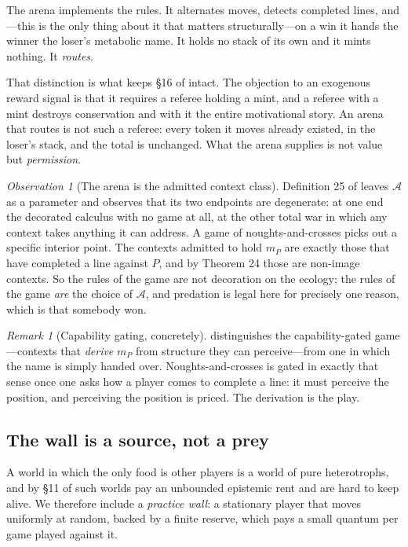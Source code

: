 \documentclass[11pt]{article}
\theoremstyle{definition}
\theoremstyle{plain}
\theoremstyle{remark}
\newtheorem{remark}[definition]{Remark}
\newtheorem{observation}[definition]{Observation}
\begin{document}
The arena implements the rules. It alternates moves, detects completed lines,
and---this is the only thing about it that matters structurally---on a win it
hands the winner the loser's metabolic name. It holds no stack of its own and it
mints nothing. It \emph{routes}.

That distinction is what keeps \S16 of \cite{scientist} intact. The objection to
an exogenous reward signal is that it requires a referee holding a mint, and a
referee with a mint destroys conservation and with it the entire motivational
story. An arena that routes is not such a referee: every token it moves already
existed, in the loser's stack, and the total is unchanged. What the arena
supplies is not value but \emph{permission}.

\begin{observation}[The arena is the admitted context class]
Definition 25 of \cite{scientist} leaves $\mathcal{A}$ as a parameter and
observes that its two endpoints are degenerate: at one end the decorated
calculus with no game at all, at the other total war in which any context takes
anything it can address. A game of noughts-and-crosses picks out a specific
interior point. The contexts admitted to hold $m_P$ are exactly those that have
completed a line against $P$, and by Theorem 24 those are non-image contexts. So
the rules of the game are not decoration on the ecology; the rules of the game
\emph{are} the choice of $\mathcal A$, and predation is legal here for precisely
one reason, which is that somebody won.
\end{observation}

\begin{remark}[Capability gating, concretely]
\cite{scientist} distinguishes the capability-gated game---contexts that
\emph{derive} $m_P$ from structure they can perceive---from one in which the
name is simply handed over. Noughts-and-crosses is gated in exactly that sense
once one asks how a player comes to complete a line: it must perceive the
position, and perceiving the position is priced. The derivation is the play.
\end{remark}

\subsection{The wall is a source, not a prey}

A world in which the only food is other players is a world of pure
heterotrophs, and by \S11 of \cite{scientist} such worlds pay an unbounded
epistemic rent and are hard to keep alive. We therefore include a
\emph{practice wall}: a stationary player that moves uniformly at random, backed
by a finite reserve, which pays a small quantum per game played against it.
\end{document}
